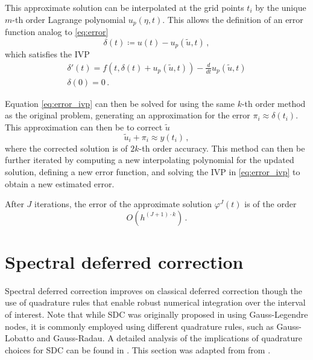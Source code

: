 This approximate solution can be interpolated at the grid points \(t_i\) by the unique \(m\)-th order Lagrange polynomial \(u_p(\eta,t)\). This allows the definition of an error function analog to \ref{eq:error}
\begin{equation}
    \delta(t) \coloneqq u(t)-u_p(\tilde{u},t)\,,
	\label{eq:interp_error}
\end{equation}
which satisfies the IVP
\begin{gather}
    \delta'(t) = f(t,\delta(t) + u_p(\tilde{u},t)) - \frac{d}{dt}u_p(\tilde{u},t) \label{eq:error_ivp}\\ 
    \delta(0) = 0\,. \nonumber
\end{gather}

Equation \ref{eq:error_ivp} can then be solved for using the same \(k\)-th order method as the original problem, generating an approximation for the error \(\pi_i \approx \delta(t_i)\). This approximation can then be to correct \(\tilde{u}\)
\begin{equation}
    \tilde{u}_i + \pi_i \approx y(t_i)\,,
	\label{eq:dc_correction}
\end{equation}
where the corrected solution is of \(2k\)-th order accuracy. This method can then be further iterated by computing a new interpolating polynomial for the updated solution, defining a new error function, and solving the IVP in \ref{eq:error_ivp} to obtain a new estimated error.

After \(J\) iterations, the error of the approximate solution \(\varphi^J(t)\) is of the order \cite{dutt2000spectral} 
\begin{equation}
    O(h^{(J+1) \cdot k})\,.
	\label{eq:dc_error}
\end{equation}

\section{Spectral deferred correction} \label{sec:math_sdc}

Spectral deferred correction improves on classical deferred correction though the use of quadrature rules that enable robust numerical integration over the interval of interest. Note that while SDC was originally proposed in \cite{dutt2000spectral} using Gauss-Legendre nodes, it is commonly employed using different quadrature rules, such as Gauss-Lobatto and Gauss-Radau. A detailed analysis of the implications of quadrature choices for SDC can be found in \cite{layton2005implications}. This section was adapted from from \cite{speck2015multi}.

